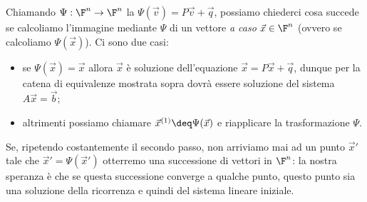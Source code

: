 Chiamando $\Psi : \F^n \to \F^n$ la  
$\Psi(\vec v) = P\vec v + \vec q$, possiamo chiederci cosa succede se calcoliamo l'immagine mediante $\Psi$ di un vettore \emph{a caso} $\vec x \in \F^n$ (ovvero se calcoliamo $\Psi(\vec x)$). Ci sono due casi: \begin{itemize}
    \item se $\Psi(\vec x) = \vec x$ allora $\vec x$ è soluzione dell'equazione $\vec x = P\vec x + \vec q$, dunque per la catena di equivalenze mostrata sopra dovrà essere soluzione del sistema $A\vec x = \vec b$;
    \item altrimenti possiamo chiamare $\vec x^{(1)} \deq \Psi(\vec x)$ e riapplicare la trasformazione $\Psi$.   
\end{itemize}

Se, ripetendo costantemente il secondo passo, non arriviamo mai ad un punto $\vec x'$ tale che $\vec x' = \Psi(\vec x')$ otterremo una successione di vettori in $\F^n$: la nostra speranza è che se questa successione converge a qualche punto, questo punto sia una soluzione della ricorrenza e quindi del sistema lineare iniziale.

